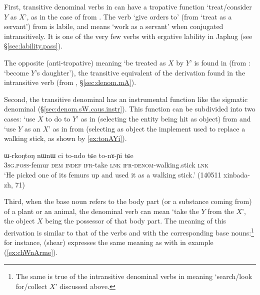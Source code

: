 First, transitive denominal verbs in  can have a tropative function `treat/consider $Y$ as $X$', as in the case of  from . The verb  `give orders to' (from `treat as a servant') from  is labile, and means `work as a servant' when conjugated intransitively. It is one of the very few verbs with ergative lability in Japhug (see §\ref{sec:lability.pass}).


The opposite (anti-tropative) meaning `be treated as $X$ by $Y$' is found in   (from : `become $Y$'s daughter'), the transitive equivalent of the  derivation found in the intransitive verb  (from  , §\ref{sec:denom.mA}). 



Second, the transitive  denominal has an instrumental function like the sigmatic denominal (§\ref{sec:denom.sW.caus.instr}). This function can be subdivided into two cases: `use $X$ to do to $Y$' as in   (selecting the entity being hit as object) from  and `use $Y$ as an $X$' as in   from  (selecting as object the implement used to replace a walking stick, as shown by \ref{ex:tonAYi}).

\begin{exe}
\ex \label{ex:tonAYi}
\gll  ɯ-rkoŋtoŋ nɯnɯ ci to-ndo tɕe to-nɤ-ɲi tɕe \\
\textsc{3sg}.\textsc{poss}-femur \textsc{dem} \textsc{indef} \textsc{ifr}-take \textsc{lnk} \textsc{ifr}-\textsc{denom}-walking.stick \textsc{lnk} \\
\glt `He picked one of its femurs up and used it as a walking stick.' (140511 xinbada-zh, 71)
\end{exe}

Third, when the base noun refers to the body part (or a substance coming from) of a plant or an animal, the denominal verb can mean `take the $Y$ from the $X$', the object $X$ being the possessor of that body part. The meaning of this derivation is similar to that of the verbs  and  with the corresponding base nouns:\footnote{The same is true of the intransitive denominal verbs in  meaning `search/look for/collect $X$' discussed above.}  for instance,  (shear) expresses the same meaning as  with  in example  (\ref{ex:chWnArme}).

